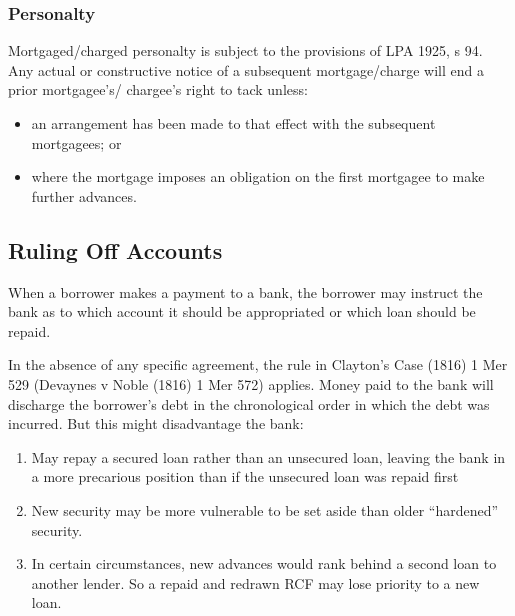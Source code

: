 \documentclass[
]{article}
\providecommand{\tightlist}{%
  \setlength{\itemsep}{0pt}\setlength{\parskip}{0pt}}
\begin{document}
\hypertarget{personalty}{%
\subsubsection{Personalty}\label{personalty}}

Mortgaged/charged personalty is subject to the provisions of LPA 1925, s
94. Any actual or constructive notice of a subsequent mortgage/charge
will end a prior mortgagee's/ chargee's right to tack unless:

\begin{itemize}
\tightlist
\item
  an arrangement has been made to that effect with the subsequent
  mortgagees; or
\item
  where the mortgage imposes an obligation on the first mortgagee to
  make further advances.
\end{itemize}

\hypertarget{ruling-off-accounts}{%
\subsection{Ruling Off Accounts}\label{ruling-off-accounts}}

When a borrower makes a payment to a bank, the borrower may instruct the
bank as to which account it should be appropriated or which loan should
be repaid.

In the absence of any specific agreement, the rule in Clayton's Case
(1816) 1 Mer 529 (Devaynes v Noble (1816) 1 Mer 572) applies. Money paid
to the bank will discharge the borrower's debt in the chronological
order in which the debt was incurred. But this might disadvantage the
bank:

\begin{enumerate}
\tightlist
\item
  May repay a secured loan rather than an unsecured loan, leaving the
  bank in a more precarious position than if the unsecured loan was
  repaid first
\item
  New security may be more vulnerable to be set aside than older
  ``hardened'' security.
\item
  In certain circumstances, new advances would rank behind a second loan
  to another lender. So a repaid and redrawn RCF may lose priority to a
  new loan.
\end{enumerate}
\end{document}
